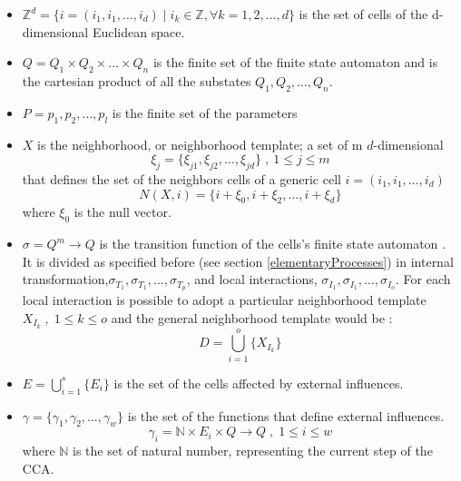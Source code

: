 \begin{itemize}
  \item \begin{math}\mathbb{Z}^d=\{i=(i_1,i_1,\ldots,i_d)\mid i_k \in
  \mathbb{Z}, \forall k=1,2,\ldots,d \}\end{math} is the set of cells of the d-dimensional
   Euclidean space.
   \item \(Q=Q_1 \times Q_2 \times \ldots \times Q_n \) is the finite set of the
   finite state automaton and is the cartesian product of all the substates
   \(Q_1, Q_2, \ldots ,Q_n \).
   \item \( P=p_1, p_2, \ldots ,p_l \) is the finite set of the
   parameters
  
   \item \begin{math}X\end{math} is the neighborhood, or neighborhood template; a
  set of m \(d\)-dimensional
  \[\xi_j=\{\xi_{j1},\xi_{j2},\ldots,\xi_{jd}\} \;,\: 1\leq j \leq m\] that
  defines the set of the neighbors cells of a generic cell
  \begin{math}i=(i_1,i_1,\ldots,i_d)\end{math}
  \[
  N(X,i)=\{i+\xi_0,i+\xi_2,\ldots,i+\xi_d\}
  \] where \begin{math}\xi_0\end{math} is the null vector.
  
  \item \begin{math}\sigma=Q^m \rightarrow Q \end{math} is the transition
  function of the cells's finite state automaton . It is divided as specified
  before (see section \ref{elementaryProcesses}) in internal
  transformation,\(\sigma_{T_{1}},\sigma_{T_{1}},\ldots,\sigma_{T_{p}}\), and
  local interactions, \(\sigma_{I_{1}},\sigma_{I_{1}},\ldots,\sigma_{I_{o}}\).
  For each local interaction is possible to adopt a particular neighborhood
  template \(X_{I_k} \;,\; 1 \leq k \leq o \) and the general neighborhood
  template would be : 
\[
   D=\bigcup_{i=1}^{o}\{X_{I_k}\}
\]

\item \(E=\bigcup_{i=1}^{s}\{E_i\} \) is the set of the cells affected by
external influences.

\item \(\gamma=\{\gamma_1,\gamma_2,\ldots,\gamma_w\}\) is the set of the
functions that define external influences.
\[
\gamma_i= \mathbb{N} \times E_i \times Q \rightarrow Q \;,\; 1 \leq i \leq w
\]
where \(\mathbb{N}\) is the set of natural number, representing the current
step of the CCA.
  
  
\end{itemize}

